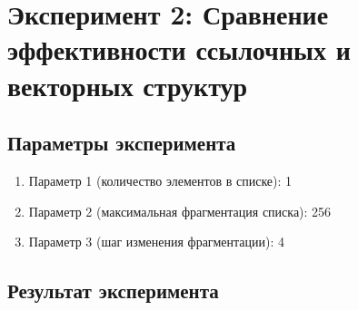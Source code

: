 \documentclass[a4paper,oneside,14pt]{extarticle}
\begin{document}






\newpage

\section{Эксперимент 2: Сравнение эффективности ссылочных и векторных структур}

\subsection{Параметры эксперимента}

\begin{enumerate}
    \item Параметр 1 (количество элементов в списке): 1
    \item Параметр 2 (максимальная фрагментация списка): 256
    \item Параметр 3 (шаг изменения фрагментации): 4
\end{enumerate}

\subsection{Результат эксперимента}
\end{document}
